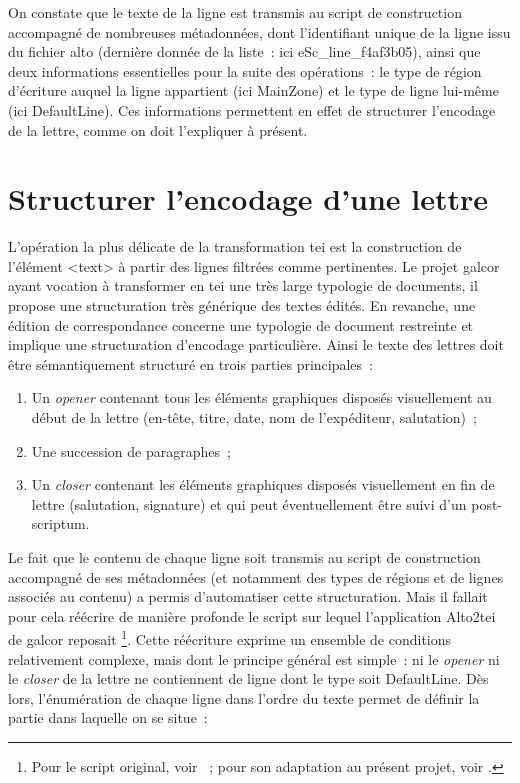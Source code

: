 \documentclass[a4paper,12pt,twoside]{book}
\begin{document}
			On constate que le texte de la ligne est transmis au script de construction accompagné de nombreuses métadonnées, dont l'identifiant unique de la ligne issu du fichier \gls{alto} (dernière donnée de la liste~: ici \textsf{eSc\_line\_f4af3b05}), ainsi que deux informations essentielles pour la suite des opérations~: le type de région d'écriture auquel la ligne appartient (ici \textsf{MainZone}) et le type de ligne lui-même (ici \textsf{DefaultLine}). Ces informations permettent en effet de structurer l'encodage de la lettre, comme on doit l'expliquer à présent.
						
		\section{Structurer l'encodage d'une lettre}

			L'opération la plus délicate de la transformation \gls{tei} est la construction de l'élément \textsf{<text>} à partir des lignes filtrées comme pertinentes. Le projet \gls{galcor} ayant vocation à transformer en \gls{tei} une très large typologie de documents, il propose une structuration très générique des textes édités. En revanche, une édition de correspondance concerne une typologie de document restreinte et implique une structuration d'encodage particulière. Ainsi le texte des lettres doit être sémantiquement structuré en trois parties principales~:
			
			\begin{enumerate}
				\item Un \textit{opener} contenant tous les éléments graphiques disposés visuellement au début de la lettre (en-tête, titre, date, nom de l'expéditeur, salutation)~;
				\item Une succession de paragraphes~;
				\item Un \textit{closer} contenant les éléments graphiques disposés visuellement en fin de lettre (salutation, signature) et qui peut éventuellement être suivi d'un post-scriptum.
			\end{enumerate}
		
			Le fait que le contenu de chaque ligne soit transmis au script de construction accompagné de ses métadonnées (et notamment des types de régions et de lignes associés au contenu) a permis d'automatiser cette structuration. Mais il fallait pour cela réécrire de manière profonde le script sur lequel l'application Alto2tei de \gls{galcor} reposait%
			\footnote{Pour le script original, voir \cite{christensenBodyBuildPy2022}~; pour son adaptation au présent projet, voir \cite{biayBuildBodyPy2022}.}.
			Cette réécriture exprime un ensemble de conditions relativement complexe, mais dont le principe général est simple~: ni le \textit{opener} ni le \textit{closer} de la lettre ne contiennent de ligne dont le type soit \textsf{DefaultLine}. Dès lors, l'énumération de chaque ligne dans l'ordre du texte permet de définir la partie dans laquelle on se situe~:
			
\end{document}
